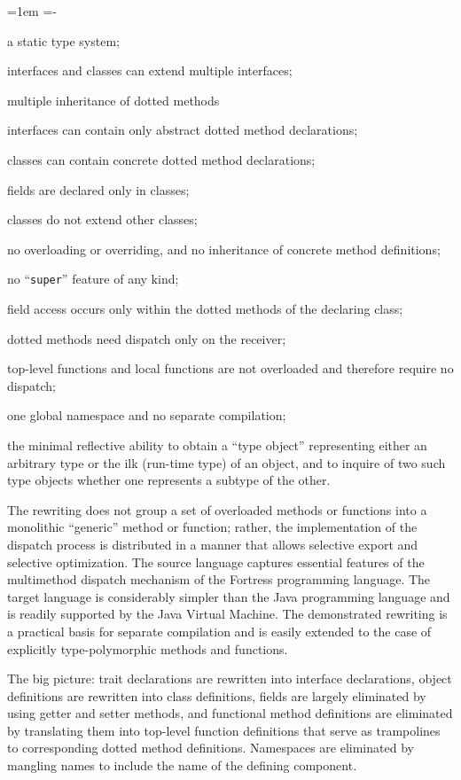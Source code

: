 \begin{trivlist}\leftskip=1em \itemindent=-\leftskip
\item[] a static type system;
\item[] interfaces and classes can extend multiple interfaces;
\item[] multiple inheritance of dotted methods
\item[] interfaces can contain only abstract dotted method declarations;
\item[] classes can contain concrete dotted method declarations;
\item[] fields are declared only in classes;
\item[] classes do not extend other classes;
\item[] no overloading or overriding, and no inheritance of concrete method definitions;
\item[] no ``{\tt super}'' feature of any kind;
\item[] field access occurs only within the dotted methods of the declaring class;
\item[] dotted methods need dispatch only on the receiver;
\item[] top-level functions and local functions are not overloaded and therefore require no dispatch;
\item[] one global namespace and no separate compilation;
\item[] the minimal reflective ability to obtain a ``type object'' representing either
an arbitrary type or the ilk (run-time type) of an object, and to inquire of
two such type objects whether one represents a subtype of the other.
\end{trivlist}

The rewriting does not group a set of overloaded methods or functions into a monolithic ``generic'' method or function;
rather, the implementation of the dispatch process is distributed in a manner that allows selective export and selective optimization.
The source language captures essential features of the multimethod dispatch mechanism of the Fortress programming language.
The target language is considerably simpler than the Java programming language and is readily supported by the Java Virtual Machine.
The demonstrated rewriting is a practical basis for separate compilation and is easily extended to the case of
explicitly type-polymorphic methods and functions.

The big picture: trait declarations are rewritten into interface declarations,
object definitions are rewritten into class definitions,
fields are largely eliminated by using getter and setter methods,
and functional method definitions are eliminated by translating them into
top-level function definitions that serve as trampolines to corresponding
dotted method definitions.  Namespaces are eliminated by mangling names
to include the name of the defining component.

